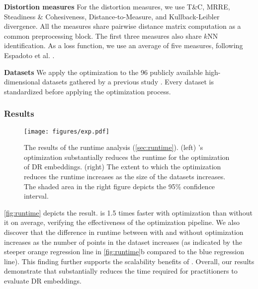 \noindent
\textbf{Distortion measures}
For the distortion measures, we use T\&C, MRRE, Steadiness \& Cohesiveness, Distance-to-Measure, and Kullback-Leibler divergence. All the measures share pairwise distance matrix computation as a common preprocessing block. The first three measures also share $k$NN identification. 
As a loss function, we use an average of five measures, following Espadoto et al. \cite{espadoto21tvcg}.

\noindent
\textbf{Datasets}
We apply the optimization to the 96 publicly available high-dimensional datasets gathered by a previous study \cite{jeon22arxiv2}. Every dataset is standardized before applying the optimization process. 


\subsubsection{Results} 


\begin{figure}
    \centering
    \texttt{[image: figures/exp.pdf]}
    \vspace{-7mm}
    \caption{    
    The results of the runtime analysis (\autoref{sec:runtime}). (left) \library{}'s optimization substantially reduces the runtime for the optimization of DR embeddings. (right) The extent to which the optimization reduces the runtime increases as the size of the datasets increases. The shaded area in the right figure depicts the 95\% confidence interval. \vspace{-4mm}}
    \label{fig:runtime}
\end{figure}



\autoref{fig:runtime} depicts the result. \library is 1.5 times faster with optimization than without it on average, verifying the effectiveness of the optimization pipeline. We also discover that the difference in runtime between with and without optimization increases as the number of points in the dataset increases (as indicated by the steeper orange regression line in \autoref{fig:runtime}b compared to the blue regression line). This finding further supports the scalability benefits of \library. Overall, our results demonstrate that \library substantially reduces the time required for practitioners to evaluate DR embeddings. 



